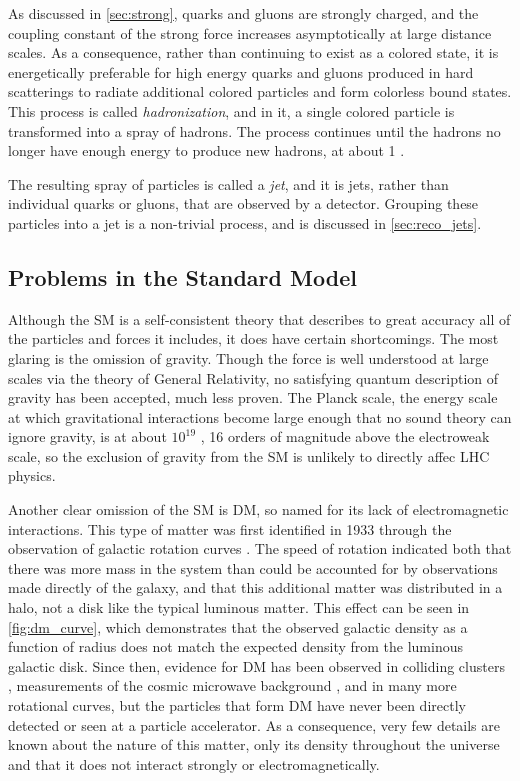 As discussed in \autoref{sec:strong}, quarks and gluons are strongly charged, and the coupling constant of the strong force increases asymptotically at large distance scales. As a consequence, rather than continuing to exist as a colored state, it is energetically preferable for high energy quarks and gluons produced in hard scatterings to radiate additional colored particles and form colorless bound states. This process is called \textit{hadronization}, and in it, a single colored particle is transformed into a spray of hadrons. The process continues until the hadrons no longer have enough energy to produce new hadrons, at about 1 \gev. 

The resulting spray of particles is called a \textit{jet}, and it is jets, rather than individual quarks or gluons, that are observed by a detector. Grouping these particles into a jet is a non-trivial process, and is discussed in \autoref{sec:reco_jets}.


\subsection{Problems in the Standard Model}
\label{sec:sm_problems}

Although the \ac{SM} is a self-consistent theory that describes to great accuracy all of the particles and forces it includes, it does have certain shortcomings. The most glaring is the omission of gravity. Though the force is well understood at large scales via the theory of General Relativity, no satisfying quantum description of gravity has been accepted, much less proven. The Planck scale, the energy scale at which gravitational interactions become large enough that no sound theory can ignore gravity, is at about $10^{19}$ \GeV, 16 orders of magnitude above the electroweak scale, so the exclusion of gravity from the \ac{SM} is unlikely to directly affec \ac{LHC} physics. 

Another clear omission of the \ac{SM} is \acf{DM}, so named for its lack of electromagnetic interactions. This type of matter was first identified in 1933 through the observation of galactic rotation curves \cite{zwicky}. The speed of rotation indicated both that there was more mass in the system than could be accounted for by observations made directly of the galaxy, and that this additional matter was distributed in a halo, not a disk like the typical luminous matter. This effect can be seen in \autoref{fig:dm_curve}, which demonstrates that the observed galactic density as a function of radius does not match the expected density from the luminous galactic disk. Since then, evidence for \ac{DM} has been observed in colliding clusters \cite{astro-ph/0608407}, measurements of the cosmic microwave background \cite{0803.0732}, and in many more rotational curves, but the particles that form \ac{DM} have never been directly detected or seen at a particle accelerator. As a consequence, very few details are known about the nature of this matter, only its density throughout the universe and that it does not interact strongly or electromagnetically. 

